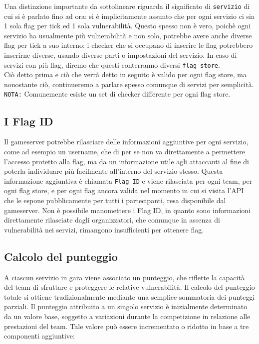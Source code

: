 Una distinzione importante da sottolineare riguarda il significato di \texttt{servizio} di cui si è parlato fino ad ora:
si è implicitamente assunto che per ogni servizio ci sia 1 sola flag per tick ed 1 sola vulnerabilità.
Questo spesso non è vero, poichè ogni servizio ha usualmente più vulnerabilità e non solo, potrebbe avere anche diverse flag per tick a suo interno:
i checker che si occupano di inserire le flag potrebbero inserirne diverse, usando diverse parti o impostazioni del servizio.
In caso di servizi con più flag, diremo che questi conterranno diversi \texttt{flag store}.\\
Ciò detto prima e ciò che verrà detto in seguito è valido per ogni flag store, ma nonostante ciò, continueremo a parlare spesso comunque di servizi per semplicità.\\

\texttt{NOTA:} Comunemente esiste un set di checker differente per ogni flag store.

\subsection{I Flag ID}

Il gameserver potrebbe rilasciare delle informazioni aggiuntive per ogni servizio, come ad esempio un username, che di per se non va direttamente a permettere l'accesso protetto alla flag,
ma da un informazione utile agli attaccanti al fine di poterla individuare più facilmente all'interno del servizio stesso.
Questa informazione aggiuntiva è chiamata \texttt{Flag ID} e viene rilasciata per ogni team, per ogni flag store, e per ogni flag ancora valida nel momento in cui si visita l'API che
le espone pubblicamente per tutti i partecipanti, resa disponibile dal gameserver. Non è possibile manomettere i Flag ID, in quanto sono informazioni direttamente rilasciate dagli
organizzatori, che comunque in assenza di vulnerabilità nei servizi, rimangono insufficienti per ottenere flag.

\subsection{Calcolo del punteggio}

A ciascun servizio in gara viene associato un punteggio, che riflette la capacità del team di sfruttare e proteggere le relative vulnerabilità. Il calcolo del punteggio totale si
ottiene tradizionalmente mediante una semplice sommatoria dei punteggi parziali.
Il punteggio attribuito a un singolo servizio è inizialmente determinato da un valore base, soggetto a variazioni durante la competizione in relazione alle prestazioni del team.
Tale valore può essere incrementato o ridotto in base a tre componenti aggiuntive:

